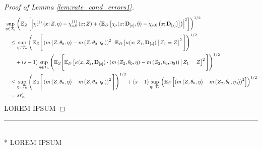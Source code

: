 \begin{proof}[Proof of Lemma \ref{lem:rate_cond_errors1}]
\begin{equation}
        \begin{aligned}
            & \sup_{\eta \in \mathcal{T}_{n}}\left(
                \mathbb{E}_{Z}\left[
                    \left|\chi_{s}^{(1)}\left(x; Z, \eta\right) 
                    - \chi_{s,0}^{(1)}\left(x; Z\right)
                    + \left(\mathbb{E}_{D}\left[\chi_{s}(x; \mathbf{D}_{[s]}, \widehat{\eta}) - \chi_{s,0}\left(x; \mathbf{D}_{[s]}\right)\right]\right)\right|^2
                \right]
            \right)^{1 / 2} \\
            & \quad \leq
             \sup_{\eta \in \mathcal{T}_{n}}\left(\mathbb{E}_{Z}\Bigg[\left(m\left(Z, \theta_{0}, \eta\right) - m\left(Z, \theta_{0}, \eta_{0}\right)\right)^{2} \cdot \mathbb{E}_{D}\left[\kappa(x; Z_{1}, \mathbf{D}_{[s]}) \, \middle| \, Z_1 = Z \right]^{2}\Bigg]\right)^{1/2}\\
            & \quad \quad + (s-1) \sup_{\eta \in \mathcal{T}_{n}} \left(\mathbb{E}_{Z}\Bigg[\mathbb{E}_{D}\left[\kappa(x; Z_{2}, \mathbf{D}_{[s]})\cdot \left(m\left(Z_{2}, \theta_{0}, \eta\right)
            - m\left(Z_{2}, \theta_{0}, \eta_{0}\right)\right) \, \middle| \, Z_1 = Z \right]^{2}\Bigg]\right)^{1/2} \\
            & \quad \leq 
            \sup_{\eta \in \mathcal{T}_{n}}\left(\mathbb{E}_{Z}\Bigg[\left(m\left(Z, \theta_{0}, \eta\right) - m\left(Z, \theta_{0}, \eta_{0}\right)\right)^{2} \Bigg]\right)^{1/2}
            + (s-1) \sup_{\eta \in \mathcal{T}_{n}} \left(\mathbb{E}_{Z}\left[\left(m\left(Z, \theta_{0}, \eta\right)
            - m\left(Z_{2}, \theta_{0}, \eta_{0}\right)\right)^{2}\right]\right)^{1/2}\\
            & \quad = s r_{n}^{\prime}
        \end{aligned}
    \end{equation}
    {\color{red} LOREM IPSUM}
\end{proof}

\hrule

\begin{boxD}
    \begin{lem}[]\label{lem:rate_cond_errors2}\mbox{}\\*
    {\color{red} LOREM IPSUM}
\end{lem}    
\end{boxD}

